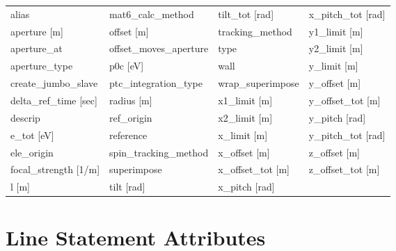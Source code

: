  \begin{tabular}{llll} \toprule
alias                            & mat6_calc_method                 & tilt_tot [rad]                   & x_pitch_tot [rad]                \\
aperture [m]                     & offset [m]                       & tracking_method                  & y1_limit [m]                     \\
aperture_at                      & offset_moves_aperture            & type                             & y2_limit [m]                     \\
aperture_type                    & p0c [eV]                         & wall                             & y_limit [m]                      \\
create_jumbo_slave               & ptc_integration_type             & wrap_superimpose                 & y_offset [m]                     \\
delta_ref_time [sec]             & radius [m]                       & x1_limit [m]                     & y_offset_tot [m]                 \\
descrip                          & ref_origin                       & x2_limit [m]                     & y_pitch [rad]                    \\
e_tot [eV]                       & reference                        & x_limit [m]                      & y_pitch_tot [rad]                \\
ele_origin                       & spin_tracking_method             & x_offset [m]                     & z_offset [m]                     \\
focal_strength [1/m]             & superimpose                      & x_offset_tot [m]                 & z_offset_tot [m]                 \\
l [m]                            & tilt [rad]                       & x_pitch [rad]                    &                                  \\
 \bottomrule
 \end{tabular}
 \vfill
 
 \section{Line Statement Attributes}
 \label{s:list.line}
 
